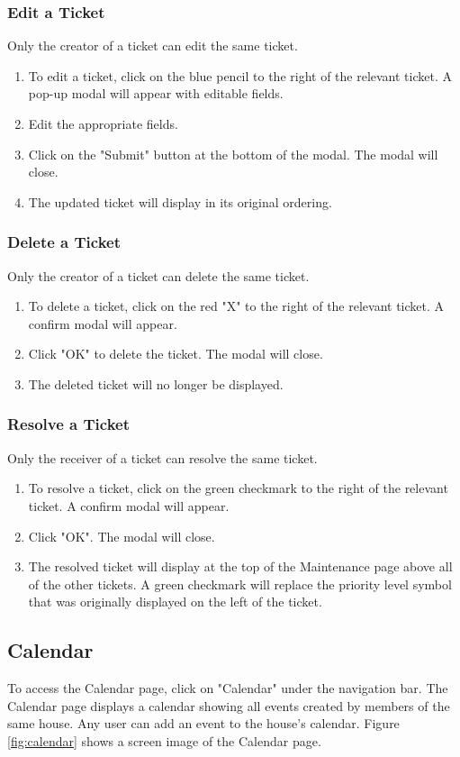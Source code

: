 \documentclass[12pt]{article}
\begin{document}
\subsubsection{Edit a Ticket}
Only the creator of a ticket can edit the same ticket.
\begin{enumerate}
\item To edit a ticket, click on the blue pencil to the right of the relevant ticket. A pop-up modal will appear with editable fields.
\item Edit the appropriate fields.
\item Click on the "Submit" button at the bottom of the modal. The modal will close.
\item The updated ticket will display in its original ordering.
\end{enumerate}

\subsubsection{Delete a Ticket}
Only the creator of a ticket can delete the same ticket.
\begin{enumerate}
\item To delete a ticket, click on the red "X" to the right of the relevant ticket. A confirm modal will appear.
\item Click "OK" to delete the ticket. The modal will close.
\item The deleted ticket will no longer be displayed.
\end{enumerate}

\subsubsection{Resolve a Ticket}
Only the receiver of a ticket can resolve the same ticket.
\begin{enumerate}
\item To resolve a ticket, click on the green checkmark to the right of the relevant ticket. A confirm modal will appear.
\item Click "OK". The modal will close.
\item The resolved ticket will display at the top of the Maintenance page above all of the other tickets. A green checkmark will replace the priority level symbol that was originally displayed on the left of the ticket.
\end{enumerate}


\subsection{Calendar}
To access the Calendar page, click on "Calendar" under the navigation bar. The Calendar page displays a calendar showing all events created by members of the same house. Any user can add an event to the house's calendar. Figure \ref{fig:calendar} shows a screen image of the Calendar page.
\end{document}
